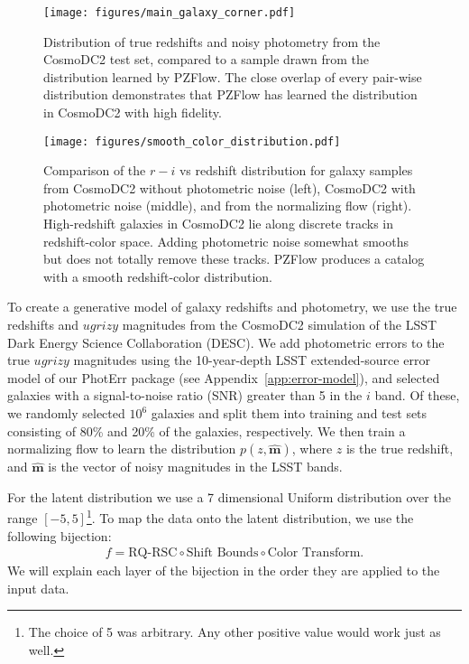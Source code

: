 \documentclass[twocolumn,twocolappendix]{aastex631}
\begin{document}
\begin{figure*}[t]
    \begin{centering}
        \texttt{[image: figures/main\_galaxy\_corner.pdf]}
        \caption{
            Distribution of true redshifts and noisy photometry from the CosmoDC2 test set, compared to a sample drawn from the distribution learned by PZFlow.
            The close overlap of every pair-wise distribution demonstrates that PZFlow has learned the distribution in CosmoDC2 with high fidelity.
        }
        \label{fig:main-corner}
    \end{centering}
\end{figure*}

\begin{figure*}[t]
    \begin{centering}
        \texttt{[image: figures/smooth\_color\_distribution.pdf]}
        \caption{
            Comparison of the $r-i$ vs redshift distribution for galaxy samples from CosmoDC2 without photometric noise (left), CosmoDC2 with photometric noise (middle), and from the normalizing flow (right).
            High-redshift galaxies in CosmoDC2 lie along discrete tracks in redshift-color space.
            Adding photometric noise somewhat smooths but does not totally remove these tracks.
            PZFlow produces a catalog with a smooth redshift-color distribution.
        }
        \label{fig:smooth-color-dist}
    \end{centering}
\end{figure*}

To create a generative model of galaxy redshifts and photometry, we use the true redshifts and $ugrizy$ magnitudes from the CosmoDC2 simulation \citep{dc2, cosmodc2} of the LSST Dark Energy Science Collaboration (DESC).
We add photometric errors to the true $ugrizy$ magnitudes using the 10-year-depth LSST extended-source error model of our PhotErr package (see Appendix~\ref{app:error-model}), and selected galaxies with a signal-to-noise ratio (SNR) greater than 5 in the $i$ band.
Of these, we randomly selected $10^6$ galaxies and split them into training and test sets consisting of 80\% and 20\% of the galaxies, respectively.
We then train a normalizing flow to learn the distribution $p(z, \mathbf{\hat{m}})$, where $z$ is the true redshift, and $\mathbf{\hat{m}}$ is the vector of noisy magnitudes in the LSST bands.

For the latent distribution we use a 7 dimensional Uniform distribution over the range $[-5, 5]$\footnote{The choice of 5 was arbitrary. Any other positive value would work just as well.}.
To map the data onto the latent distribution, we use the following bijection:
\begin{align}
    f = \text{RQ-RSC} \circ \text{Shift Bounds} \circ \text{Color Transform}.
\end{align}
We will explain each layer of the bijection in the order they are applied to the input data.
\end{document}
